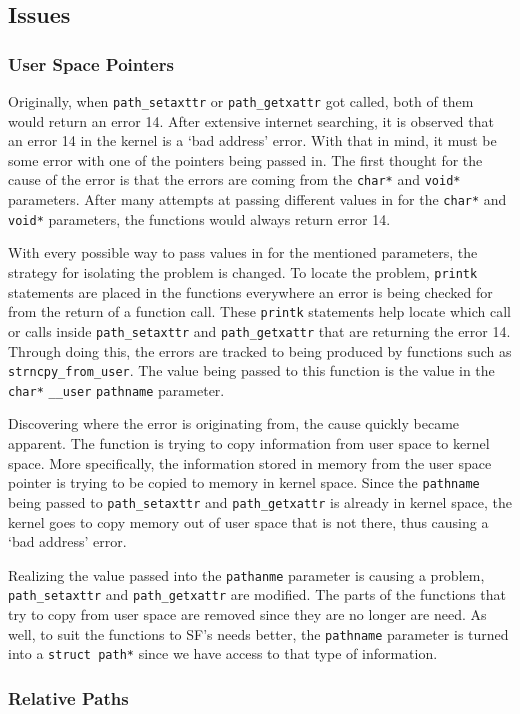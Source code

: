 \subsection{Issues}
\subsubsection*{User Space Pointers}
Originally, when \texttt{path\_setaxttr} or \texttt{path\_getxattr} got called, both of them would return an error 14. After extensive internet searching, it is observed that an error 14 in the kernel is a `bad address' error. With that in mind, it must be some error with one of the pointers being passed in. The first thought for the cause of the error is that the errors are coming from the \texttt{char*} and \texttt{void*} parameters. After many attempts at passing different values in for the \texttt{char*} and \texttt{void*} parameters, the functions would always return error 14. 

With every possible way to pass values in for the mentioned parameters, the strategy for isolating the problem is changed. To locate the problem, \texttt{printk} statements are placed in the functions everywhere an error is being checked for from the return of a function call. These \texttt{printk} statements help locate which call or calls inside \texttt{path\_setaxttr} and \texttt{path\_getxattr} that are returning the error 14. Through doing this, the errors are tracked to being produced by functions such as \texttt{strncpy\_from\_user}. The value being passed to this function is the value in the \texttt{char*} \texttt{\_\_user} \texttt{pathname} parameter. 

Discovering where the error is originating from, the cause quickly became apparent. The function is trying to copy information from user space to kernel space. More specifically, the information stored in memory from the user space pointer is trying to be copied to memory in kernel space. Since the \texttt{pathname} being passed to \texttt{path\_setaxttr} and \texttt{path\_getxattr} is already in kernel space, the kernel goes to copy memory out of user space that is not there, thus causing a `bad address' error.

Realizing the value passed into the \texttt{pathanme} parameter is causing a problem, \texttt{path\_setaxttr} and \texttt{path\_getxattr} are modified. The parts of the functions that try to copy from user space are removed since they are no longer are need. As well, to suit the functions to SF's needs better, the \texttt{pathname} parameter is turned into a \texttt{struct path*} since we have access to that type of information.

\subsubsection*{Relative Paths}